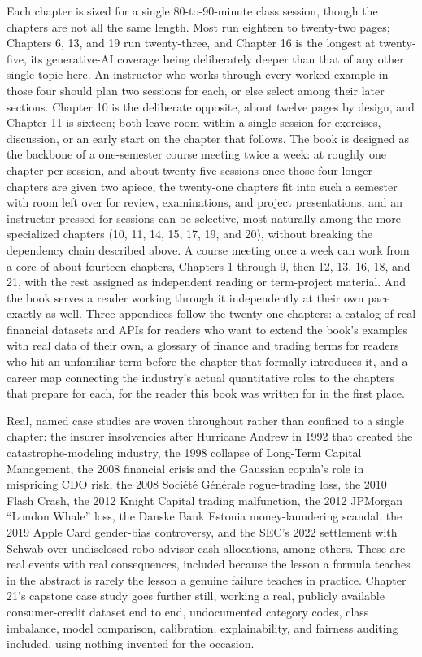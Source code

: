 \documentclass{book}
\begin{document}
Each chapter is sized for a single 80-to-90-minute class session, though the chapters are not all the same length. Most run eighteen to twenty-two pages; Chapters 6, 13, and 19 run twenty-three, and Chapter 16 is the longest at twenty-five, its generative-AI coverage being deliberately deeper than that of any other single topic here. An instructor who works through every worked example in those four should plan two sessions for each, or else select among their later sections. Chapter 10 is the deliberate opposite, about twelve pages by design, and Chapter 11 is sixteen; both leave room within a single session for exercises, discussion, or an early start on the chapter that follows. The book is designed as the backbone of a one-semester course meeting twice a week: at roughly one chapter per session, and about twenty-five sessions once those four longer chapters are given two apiece, the twenty-one chapters fit into such a semester with room left over for review, examinations, and project presentations, and an instructor pressed for sessions can be selective, most naturally among the more specialized chapters (10, 11, 14, 15, 17, 19, and 20), without breaking the dependency chain described above. A course meeting once a week can work from a core of about fourteen chapters, Chapters 1 through 9, then 12, 13, 16, 18, and 21, with the rest assigned as independent reading or term-project material. And the book serves a reader working through it independently at their own pace exactly as well. Three appendices follow the twenty-one chapters: a catalog of real financial datasets and APIs for readers who want to extend the book's examples with real data of their own, a glossary of finance and trading terms for readers who hit an unfamiliar term before the chapter that formally introduces it, and a career map connecting the industry's actual quantitative roles to the chapters that prepare for each, for the reader this book was written for in the first place.

Real, named case studies are woven throughout rather than confined to a single chapter: the insurer insolvencies after Hurricane Andrew in 1992 that created the catastrophe-modeling industry, the 1998 collapse of Long-Term Capital Management, the 2008 financial crisis and the Gaussian copula's role in mispricing CDO risk, the 2008 Soci\'et\'e G\'en\'erale rogue-trading loss, the 2010 Flash Crash, the 2012 Knight Capital trading malfunction, the 2012 JPMorgan ``London Whale'' loss, the Danske Bank Estonia money-laundering scandal, the 2019 Apple Card gender-bias controversy, and the SEC's 2022 settlement with Schwab over undisclosed robo-advisor cash allocations, among others. These are real events with real consequences, included because the lesson a formula teaches in the abstract is rarely the lesson a genuine failure teaches in practice. Chapter 21's capstone case study goes further still, working a real, publicly available consumer-credit dataset end to end, undocumented category codes, class imbalance, model comparison, calibration, explainability, and fairness auditing included, using nothing invented for the occasion.
\end{document}
